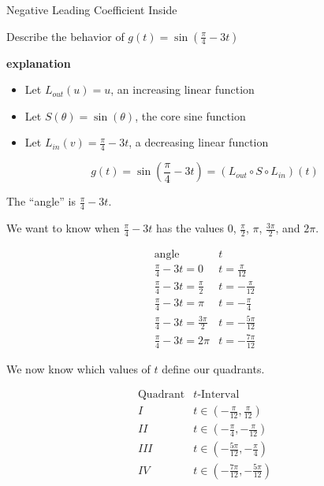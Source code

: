 \documentclass{ximera}
\begin{document}
\begin{example} Negative Leading Coefficient Inside

Describe the behavior of   $g(t) = \sin\left( \frac{\pi}{4} - 3 t \right)$



\textbf{\textcolor{red!75!green}{explanation}} 







\begin{itemize}
\item Let $L_{out}(u) = u$, an increasing linear function
\item Let $S(\theta) = \sin(\theta)$, the core sine function
\item Let $L_{in}(v) = \frac{\pi}{4} - 3 t$, a decreasing linear function
\end{itemize}


\[
g(t) = \sin\left( \frac{\pi}{4} - 3 t \right) = (L_{out} \circ S \circ L_{in})(t)
\]





The ``angle'' is $\frac{\pi}{4} - 3 t$.

We want to know when $\frac{\pi}{4} - 3 t$ has the values $0$, $\frac{\pi}{2}$, $\pi$, $\frac{3\pi}{2}$, and $2\pi$.






\[
\begin{array}{l|l}
\text{angle}                  & t  \\ \hline
\frac{\pi}{4} - 3 t = 0        & t = \frac{\pi}{12}  \\
\frac{\pi}{4} - 3 t = \frac{\pi}{2}      &  t = -\frac{\pi}{12} \\
\frac{\pi}{4} - 3 t = \pi      & t = -\frac{\pi}{4}  \\
\frac{\pi}{4} - 3 t = \frac{3\pi}{2}     & t = -\frac{5\pi}{12}   \\
\frac{\pi}{4} - 3 t = 2\pi     & t = -\frac{7\pi}{12}
\end{array}
\]


We now know which values of $t$ define our quadrants. 




\[
\begin{array}{l|l}
\text{Quadrant}                  & t\text{-Interval}  \\ \hline
I        & t \in  \left( -\frac{\pi}{12}, \frac{\pi}{12} \right)  \\
II       & t \in  \left( -\frac{\pi}{4}, -\frac{\pi}{12} \right) \\
III      & t \in  \left( -\frac{5\pi}{12}, -\frac{\pi}{4} \right)  \\
IV       & t \in  \left( -\frac{7\pi}{12}, -\frac{5\pi}{12} \right)   \\
\end{array}
\]


\end{example}
\end{document}
